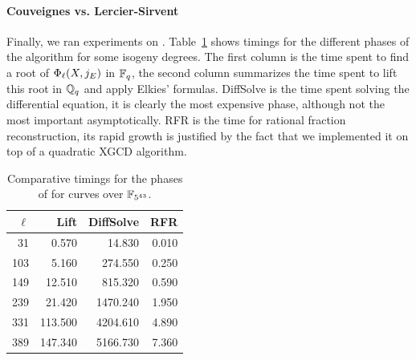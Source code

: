 \paragraph{Couveignes vs. Lercier-Sirvent}
Finally, we ran experiments on
. 
Table~\ref{tab:ls} shows
timings for the different phases of the algorithm for some isogeny
degrees. The first column is the time spent to find a root of
$\Phi_\ell(X,j_E)$ in $\mathbb{F}_q$, the second column summarizes the time
spent to lift this root in $\mathbb{Q}_q$ and apply Elkies'
formulas. DiffSolve is the time spent solving the differential
equation, it is clearly the most expensive phase, although not the
most important asymptotically. RFR is the time for rational fraction
reconstruction, its rapid growth is justified by the fact that we
implemented it on top of a quadratic XGCD algorithm.

\begin{table}
  \centering
  \begin{tabular}{r r r r}
    \hline
    $\ell$ & Lift & DiffSolve & RFR\\
    \hline
    31  &   0.570 &   14.830 & 0.010\\
    103 &   5.160 &  274.550 & 0.250\\
    149 &  12.510 &  815.320 & 0.590\\
    239 &  21.420 & 1470.240 & 1.950\\
    331 & 113.500 & 4204.610 & 4.890\\
    389 & 147.340 & 5166.730 & 7.360\\
  \end{tabular}
  \caption{Comparative timings for the phases of  
    for curves over $\mathbb{F}_{5^{43}}$.}
  \label{tab:ls}
\end{table}


